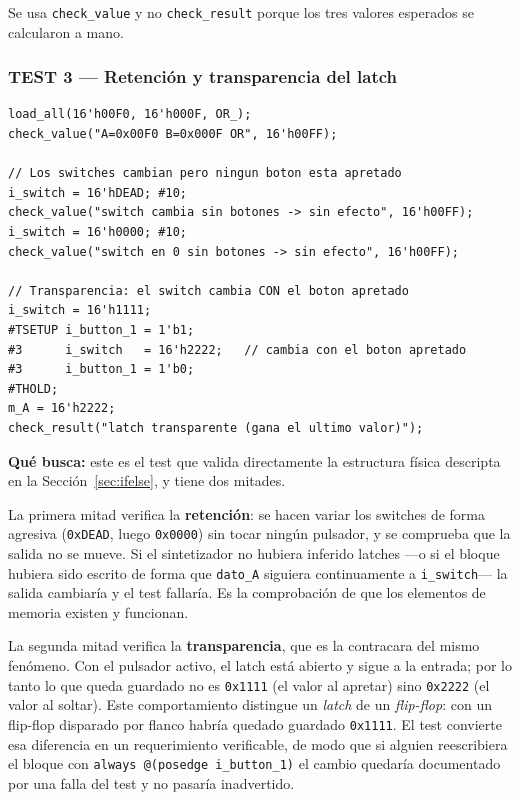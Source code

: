 \documentclass[12pt,a4paper]{article}
\begin{document}
Se usa \texttt{check\_value} y no \texttt{check\_result} porque los tres valores
esperados se calcularon a mano.

\subsubsection{TEST 3 --- Retención y transparencia del latch}
\label{sec:test3}

\begin{lstlisting}[caption={Verificación del comportamiento del latch.}]
load_all(16'h00F0, 16'h000F, OR_);
check_value("A=0x00F0 B=0x000F OR", 16'h00FF);

// Los switches cambian pero ningun boton esta apretado
i_switch = 16'hDEAD; #10;
check_value("switch cambia sin botones -> sin efecto", 16'h00FF);
i_switch = 16'h0000; #10;
check_value("switch en 0 sin botones -> sin efecto", 16'h00FF);

// Transparencia: el switch cambia CON el boton apretado
i_switch = 16'h1111;
#TSETUP i_button_1 = 1'b1;
#3      i_switch   = 16'h2222;   // cambia con el boton apretado
#3      i_button_1 = 1'b0;
#THOLD;
m_A = 16'h2222;
check_result("latch transparente (gana el ultimo valor)");
\end{lstlisting}

\textbf{Qué busca:} este es el test que valida directamente la estructura física
descripta en la Sección~\ref{sec:ifelse}, y tiene dos mitades.

La primera mitad verifica la \textbf{retención}: se hacen variar los switches de
forma agresiva (\texttt{0xDEAD}, luego \texttt{0x0000}) sin tocar ningún
pulsador, y se comprueba que la salida no se mueve. Si el sintetizador no
hubiera inferido latches —o si el bloque hubiera sido escrito de forma que
\texttt{dato\_A} siguiera continuamente a \texttt{i\_switch}— la salida cambiaría
y el test fallaría. Es la comprobación de que los elementos de memoria existen y
funcionan.

La segunda mitad verifica la \textbf{transparencia}, que es la contracara del
mismo fenómeno. Con el pulsador activo, el latch está abierto y sigue a la
entrada; por lo tanto lo que queda guardado no es \texttt{0x1111} (el valor al
apretar) sino \texttt{0x2222} (el valor al soltar). Este comportamiento
distingue un \emph{latch} de un \emph{flip-flop}: con un flip-flop disparado por
flanco habría quedado guardado \texttt{0x1111}. El test convierte esa diferencia
en un requerimiento verificable, de modo que si alguien reescribiera el bloque
con \texttt{always @(posedge i\_button\_1)} el cambio quedaría documentado por
una falla del test y no pasaría inadvertido.
\end{document}
